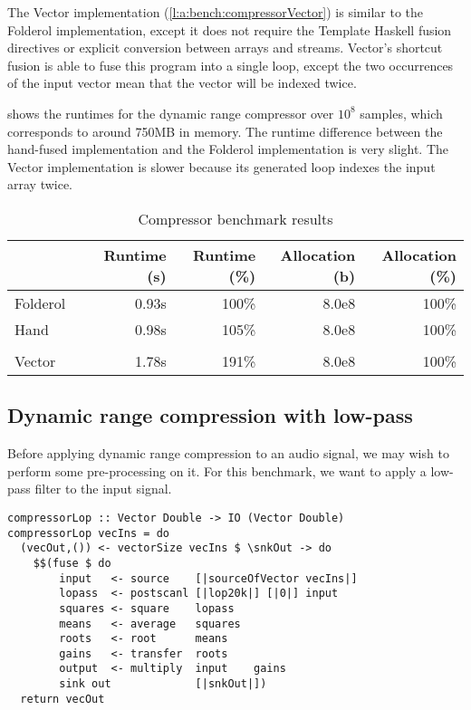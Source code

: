 The Vector implementation (\cref{l:a:bench:compressorVector}) is similar to the Folderol implementation, except it does not require the Template Haskell fusion directives or explicit conversion between arrays and streams.
Vector's shortcut fusion is able to fuse this program into a single loop, except the two occurrences of the input vector mean that the vector will be indexed twice.

 shows the runtimes for the dynamic range compressor over $10^8$ samples, which corresponds to around 750MB in memory.
The runtime difference between the hand-fused implementation and the Folderol implementation is very slight. 
The Vector implementation is slower because its generated loop indexes the input array twice.

\begin{table}
\begin{center}
\begin{tabular}{ll|rrrr}
& & Runtime (s)  & Runtime (\%) & Allocation (b) & Allocation (\%) \\
\hline
Folderol &          & 0.93s &   100\% & 8.0e8 & 100\% \\
Hand     &          & 0.98s &   105\% & 8.0e8 & 100\% \\
&&&\\
Vector &            & 1.78s &   191\% & 8.0e8 & 100\%\\
\end{tabular}
\end{center}
\caption[Compressor benchmark results]{Compressor benchmark results}
\label{table:bench:compressor}
\end{table}

\subsection{Dynamic range compression with low-pass}
Before applying dynamic range compression to an audio signal, we may wish to perform some pre-processing on it.
For this benchmark, we want to apply a low-pass filter to the input signal.

\begin{lstlisting}[float,label=l:bench:compressorLopFolderol,caption=Folderol implementation of \Hs/compressor/ with low-pass]
compressorLop :: Vector Double -> IO (Vector Double)
compressorLop vecIns = do
  (vecOut,()) <- vectorSize vecIns $ \snkOut -> do
    $$(fuse $ do
        input   <- source    [|sourceOfVector vecIns|]
        lopass  <- postscanl [|lop20k|] [|0|] input
        squares <- square    lopass
        means   <- average   squares
        roots   <- root      means
        gains   <- transfer  roots
        output  <- multiply  input    gains
        sink out             [|snkOut|])
  return vecOut
\end{lstlisting}


